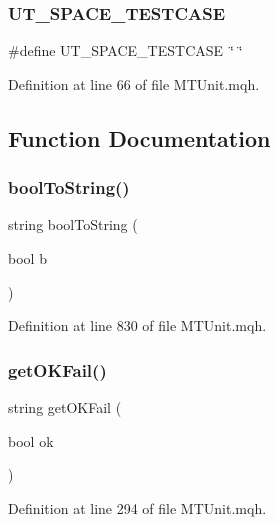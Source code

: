 \subsubsection{\texorpdfstring{U\+T\+\_\+\+S\+P\+A\+C\+E\+\_\+\+T\+E\+S\+T\+C\+A\+SE}{UT\_SPACE\_TESTCASE}}
{\footnotesize\ttfamily \#define U\+T\+\_\+\+S\+P\+A\+C\+E\+\_\+\+T\+E\+S\+T\+C\+A\+SE~\char`\"{}  \char`\"{}}



Definition at line 66 of file M\+T\+Unit.\+mqh.



\subsection{Function Documentation}
\mbox{\label{_m_t_unit_8mqh_a846b4d0b246628bc40f57371459bdf2f}} 
\subsubsection{\texorpdfstring{bool\+To\+String()}{boolToString()}}
{\footnotesize\ttfamily string bool\+To\+String (\begin{DoxyParamCaption}\item[{bool}]{b }\end{DoxyParamCaption})}



Definition at line 830 of file M\+T\+Unit.\+mqh.

\mbox{\label{_m_t_unit_8mqh_a560d9b8bdbe896abd079b6c9d7bd107f}} 
\subsubsection{\texorpdfstring{get\+O\+K\+Fail()}{getOKFail()}}
{\footnotesize\ttfamily string get\+O\+K\+Fail (\begin{DoxyParamCaption}\item[{bool}]{ok }\end{DoxyParamCaption})}



Definition at line 294 of file M\+T\+Unit.\+mqh.

